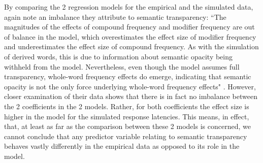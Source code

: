 By comparing the 2 regression models for the empirical and
the simulated data, \citet{Baayenetal:2011} again note an imbalance they
attribute to semantic transparency: ``The magnitudes of the effects of compound frequency and modifier
  frequency are out of balance in the model, which overestimates the
  effect size of modifier frequency and underestimates the effect size
  of compound frequency. As with the simulation of derived words, this
  is due to information about semantic opacity being withheld from the
  model. Nevertheless, even though the model assumes full
  transparency, whole-word frequency effects do emerge, indicating
  that semantic opacity is not the only force underlying whole-word
  frequency effects" \citep[470]{Baayenetal:2011}. However, closer
  examination of their data shows  that there is in fact no imbalance
  between the 2 coefficients in the 2 models. Rather, for both
  coefficients the effect size is higher in the model for the simulated
  response latencies. %
This means, in effect, that, at least as far as the comparison between
these 2 models is
concerned, we cannot conclude that any predictor variable relating to
semantic transparency behaves vastly differently in the empirical data
as opposed to its role in the model.

